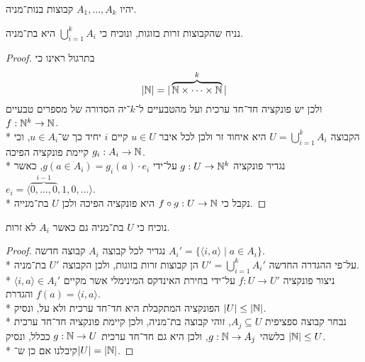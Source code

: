 \Question{}
יהיו $A_1, \hdots, A_k$ קבוצות בנות־מניה.

\Subquestion{}
נניח שהקבוצות זרות בזוגות, ונוכיח כי $\bigcup_{i = 1}^k A_i$ היא בת־מניה.
\begin{proof}
	בתרגול ראינו כי
	\[
		|\mathbb{N}| = |\overbrace{\mathbb{N} \times \cdots \times \mathbb{N}}^k |
	\]
	ולכן יש פונקציה חד־חד ערכית ועל מהטבעיים ל־$k$־יה הסדורה של מספרים טבעיים $f : \mathbb{N}^k \to \mathbb{N}$. \\*
	הקבוצה $U = \bigcup_{i = 1}^k A_i$ היא איחוד זר ולכן לכל איבר $u \in U$ קיים $i$ יחיד כך ש־$u \in A_i$, וכי קיימת פונקציה הפיכה $g_i : A_i \to \mathbb{N}$. \\*
	נגדיר פונקציה $g : U \to \mathbb{N}^k$ על־ידי $g(a \in A_i) = g_i(a) \cdot e_i$, כאשר $e_i = \langle \overbrace{0, \hdots, 0}^{i - 1}, 1, 0, \hdots \rangle$. \\*
	נקבל כי $f \circ g : U \to \mathbb{N}$ היא פונקציה הפיכה ולכן $U$ בת־מנייה.
\end{proof}

\Subquestion{}
נוכיח כי $U$ בת־מניה גם כאשר $A_i$ לא זרות.
\begin{proof}
	נגדיר לכל קבוצה $A_i$ קבוצה חדשה $A_i' = \{ \langle i, a \rangle \mid a \in A_i \}$. \\*
	על־פי ההגדרה החדשה $U' = \bigcup_{i = 1}^k A_i'$ הן קבוצות זרות בזוגות, ולכן הקבוצה $U'$ בת־מניה. \\*
	ניצור פונקציה $f : U \to U'$ על־ידי בחירת האינדקס המינימלי אשר מקיים $\langle i, a \rangle \in A_i'$ והגדרת $f(a) = \langle i, a \rangle$. \\*
	הפונקציה המתקבלת היא חד־חד ערכית ולא על, ונסיק $|U| \le |\mathbb{N}|$. \\*
	נבחר קבוצה ספציפית $A_j \subseteq U$, זוהי קבוצה בת־מניה, ולכן קיימת פונקציה חד־חד ערכית כלשהי $g : \mathbb{N} \to A_j$, ולכן היא גם חד־חד ערכית $g : \mathbb{N} \to U$ ככלל, ונסיק $|\mathbb{N}| \le U$. \\*
	קיבלנו אם כן ש־$|U| = |\mathbb{N}|$.
\end{proof}


